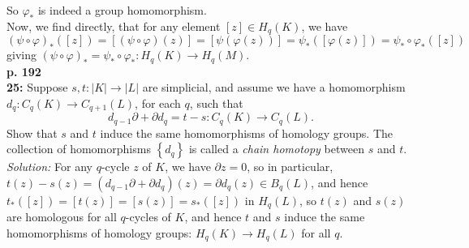 \documentclass[a4paper]{article}
\begin{document}
    So $\varphi_*$ is indeed a group homomorphism.\\
    \linebreak
    Now, we find directly, that for any
    element $\left[ z \right] \in 
    H_q(K)$, we have
    \[
        \left( \psi \circ \varphi \right)_*
        \left( \left[ z \right]  \right) 
        = \left[ \left( \psi \circ \varphi \right) (z) \right] 
        = \left[ \psi \left( \varphi\left( z \right)  \right)  \right] 
        = \psi_* \left( \left[ \varphi(z) \right]  \right) 
        = \psi_* \circ \varphi_* \left( \left[ z \right]  \right) 
    \] 
    giving $\left( \psi \circ \varphi \right)_* =
    \psi_* \circ \varphi_*  \colon H_q(K) \to H_q(M)$.\\
    \linebreak
    \textbf{p. 192}\\
    \textbf{25:} Suppose $s,t  \colon \left| K \right| \to 
    \left| L \right| $ are simplicial, and assume we have a homomorphism
    $d_q  \colon C_q (K) \to C_{q+1}(L)$, for each $q$, such that
    \[
    d_{q-1} \partial + \partial d_q = t -s  \colon C_q (K) \to C_q(L).
    \] 
    Show that $s$ and $t$ induce the same homomorphisms of homology groups. The
    collection of homomorphisms $\left\{ d_q \right\} $ is called a
    \textit{chain homotopy} between $s$ and $t$.\\
    \linebreak
    \textit{Solution:} For any $q$-cycle $z$ of $K$, we have
    $\partial z = 0$, so in particular,
    $t(z) - s(z) = \left( d_{q-1} \partial + \partial d_q \right) (z)
    = \partial d_q(z) \in 
    B_q(L)$, and hence $t_* \left( \left[ z \right]  \right) =
    \left[ t(z) \right] = \left[ s(z) \right]
    = s_* \left( \left[ z \right]  \right) $ in
    $H_q(L)$, so
    $t(z)$ and $s(z)$ are homologous for all $q$-cycles of $K$, and hence
     $t$ and $s$ induce the same homomorphisms of homology groups: $H_q(K) \to H_q(L)$ for all
     $q$.
    
    

 
\end{document}
